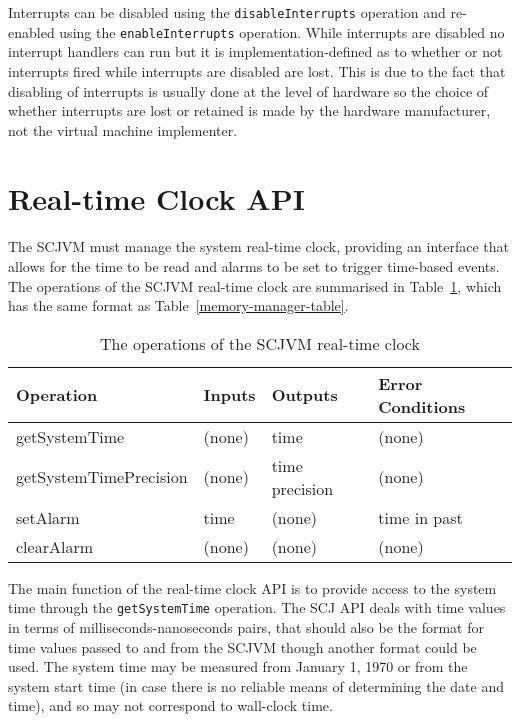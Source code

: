 \documentclass[a4paper,10pt]{report}
\begin{document}
Interrupts can be disabled using the \texttt{disable\-Interrupts}
operation and re-enabled using the \texttt{enable\-Interrupts}
operation.
While interrupts are disabled no interrupt handlers can run but it is
implemen\-tation-defined as to whether or not interrupts fired while
interrupts are disabled are lost.
This is due to the fact that disabling of interrupts is usually done
at the level of hardware so the choice of whether interrupts are lost
or retained is made by the hardware manufacturer, not the virtual
machine implementer.

\section{Real-time Clock API}
\label{realtime-clock-section}

The SCJVM must manage the system real-time clock, providing an
interface that allows for the time to be read and alarms to be set to
trigger time-based events.
The operations of the SCJVM real-time clock are summarised in
Table~\ref{realtime-clock-table}, which has the same format as
Table~\ref{memory-manager-table}.

\begin{table}[ht]
  \centering
  \footnotesize
  \begin{tabular}{|l|p{0.9cm}|p{1.8cm}|p{2.3cm}|}
    Operation & Inputs & Outputs & Error Conditions \\
    \hline
    getSystemTime &
    (none) &
    time &
    (none)
    \\getSystemTimePrecision &
    (none) &
    time precision &
    (none)
    \\setAlarm &
    time &
    (none) &
    time in past
    \\clearAlarm &
    (none) &
    (none) &
    (none)
  \end{tabular}
  \caption{The operations of the SCJVM real-time clock}
  \label{realtime-clock-table}
\end{table}

The main function of the real-time clock API is to provide access to
the system time through the \texttt{get\-System\-Time} operation.
The SCJ API deals with time values in terms of
milliseconds-nanoseconds pairs, that should also be the format for
time values passed to and from the SCJVM though another format could
be used.
The system time may be measured from January 1, 1970 or from the
system start time (in case there is no reliable means of determining
the date and time), and so may not correspond to wall-clock time.
\end{document}
